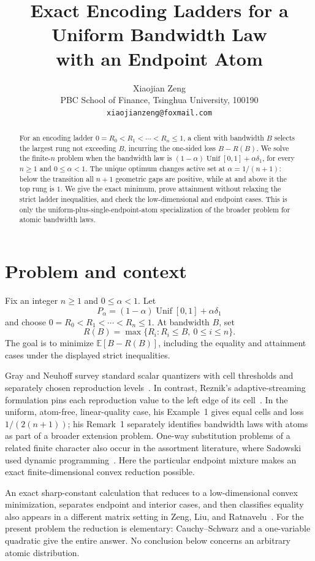 \documentclass[11pt]{article}
\title{Exact Encoding Ladders for a Uniform Bandwidth Law\\
with an Endpoint Atom}
\author{Xiaojian Zeng\\
PBC School of Finance, Tsinghua University, 100190\\
\texttt{xiaojianzeng@foxmail.com}}
\date{}
\newcommand{\Unif}{\operatorname{Unif}}
\newcommand{\E}{\mathbb{E}}
\begin{document}
\maketitle

\begin{abstract}
For an encoding ladder \(0=R_0<R_1<\cdots<R_n\leq 1\), a client with
bandwidth \(B\) selects the largest rung not exceeding \(B\), incurring the
one-sided loss \(B-R(B)\).  We solve the finite-\(n\) problem when the bandwidth
law is \((1-\alpha)\Unif[0,1]+\alpha\delta_1\), for every \(n\geq1\) and
\(0\leq\alpha<1\).  The unique optimum changes active set at
\(\alpha=1/(n+1)\): below the transition all \(n+1\) geometric gaps are
positive, while at and above it the top rung is \(1\).  We give the exact
minimum, prove attainment without relaxing the strict ladder inequalities,
and check the low-dimensional and endpoint cases.  This is only the
uniform-plus-single-endpoint-atom specialization of the broader problem for
atomic bandwidth laws.
\end{abstract}

\section{Problem and context}

Fix an integer \(n\geq1\) and \(0\leq\alpha<1\).  Let
\[
 P_\alpha=(1-\alpha)\Unif[0,1]+\alpha\delta_1
\]
and choose \(0=R_0<R_1<\cdots<R_n\leq1\).  At bandwidth \(B\), set
\[
 R(B)=\max\{R_i:R_i\leq B,\ 0\leq i\leq n\}.
\]
The goal is to minimize \(\E[B-R(B)]\), including the equality and
attainment cases under the displayed strict inequalities.

Gray and Neuhoff survey standard scalar quantizers with cell thresholds and
separately chosen reproduction levels~\cite{GrayNeuhoff1998}.  In contrast,
Reznik's adaptive-streaming formulation pins each reproduction value to the
left edge of its cell~\cite{Reznik2026}.  In the uniform,
atom-free, linear-quality case, his Example~1 gives equal cells and loss
\(1/(2(n+1))\); his Remark~1 separately identifies bandwidth laws with atoms
as part of a broader extension problem.  One-way substitution problems of a
related finite character also occur in the assortment literature, where
Sadowski used dynamic programming~\cite{Sadowski1959}.  Here the particular
endpoint mixture makes an exact finite-dimensional convex reduction possible.

An exact sharp-constant calculation that reduces to a low-dimensional convex
minimization, separates endpoint and interior cases, and then classifies
equality also appears in a different matrix setting in Zeng, Liu, and
Ratnavelu~\cite{202608.1346}.
For the present problem the reduction is elementary: Cauchy--Schwarz and a
one-variable quadratic give the entire answer.  No conclusion below concerns
an arbitrary atomic distribution.
\end{document}

